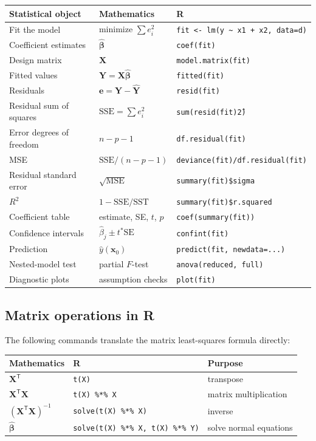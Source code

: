 \documentclass[11pt]{article}
\begin{document}
\begin{longtable}{p{}p{}p{}}
\toprule
Statistical object & Mathematics & R\\
\midrule
\endhead
Fit the model & minimize $\sum e_i^2$ & \texttt{fit <- lm(y \textasciitilde{} x1 + x2, data=d)}\\
Coefficient estimates & $\widehat{\boldsymbol\beta}$ & \texttt{coef(fit)}\\
Design matrix & $\mathbf X$ & \texttt{model.matrix(fit)}\\
Fitted values & $\widehat{\mathbf Y}=\mathbf X\widehat{\boldsymbol\beta}$ & \texttt{fitted(fit)}\\
Residuals & $\mathbf e=\mathbf Y-\widehat{\mathbf Y}$ & \texttt{resid(fit)}\\
Residual sum of squares & $\mathrm{SSE}=\sum e_i^2$ & \texttt{sum(resid(fit)\^2)}\\
Error degrees of freedom & $n-p-1$ & \texttt{df.residual(fit)}\\
MSE & $\mathrm{SSE}/(n-p-1)$ & \texttt{deviance(fit)/df.residual(fit)}\\
Residual standard error & $\sqrt{\mathrm{MSE}}$ & \texttt{summary(fit)\$sigma}\\
$R^2$ & $1-\mathrm{SSE}/\mathrm{SST}$ & \texttt{summary(fit)\$r.squared}\\
Coefficient table & estimate, SE, $t$, $p$ & \texttt{coef(summary(fit))}\\
Confidence intervals & $\widehat\beta_j\pm t^*\mathrm{SE}$ & \texttt{confint(fit)}\\
Prediction & $\widehat y(\mathbf x_0)$ & \texttt{predict(fit, newdata=...)}\\
Nested-model test & partial $F$-test & \texttt{anova(reduced, full)}\\
Diagnostic plots & assumption checks & \texttt{plot(fit)}\\
\bottomrule
\end{longtable}

\subsection{Matrix operations in R}

The following commands translate the matrix least-squares formula directly:
\begin{center}
\begin{tabular}{lll}
\toprule
Mathematics & R & Purpose\\
\midrule
$\mathbf X^{\mathsf T}$ & \texttt{t(X)} & transpose\\
$\mathbf X^{\mathsf T}\mathbf X$ & \texttt{t(X) \%*\% X} & matrix multiplication\\
$(\mathbf X^{\mathsf T}\mathbf X)^{-1}$ & \texttt{solve(t(X) \%*\% X)} & inverse\\
$\widehat{\boldsymbol\beta}$ & \texttt{solve(t(X) \%*\% X, t(X) \%*\% Y)} & solve normal equations\\
\bottomrule
\end{tabular}
\end{center}
\end{document}
